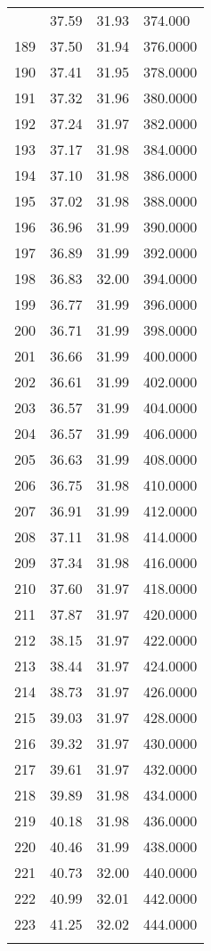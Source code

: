 \documentclass[
  captions=tableheading,
]{scrartcl}
\begin{document}
\begin{longtable} {l|l|l|l}
{188 &	 37.59 & 31.93 & 374.000\\
189 &	37.50 &	31.94 &	376.0000\\
190 &	37.41 &	31.95 &	378.0000\\
191 &	37.32 &	31.96 &	380.0000\\
192 &	37.24 &	31.97 &	382.0000\\
193 &	37.17 &	31.98 &	384.0000\\
194 &	37.10 &	31.98 &	386.0000\\
195 &	37.02 &	31.98 &	388.0000\\
196 &	36.96 &	31.99 &	390.0000\\
197 &	36.89 &	31.99 &	392.0000\\
198 &	36.83 &	32.00 &	394.0000\\
199 &	36.77 &	31.99 &	396.0000\\
200 &	36.71 &	31.99 &	398.0000\\
201 &	36.66 &	31.99 &	400.0000\\
202 &	36.61 &	31.99 &	402.0000\\
203 &	36.57 &	31.99 &	404.0000\\
204 &	36.57 &	31.99 &	406.0000\\
205 &	36.63 &	31.99 &	408.0000\\
206 &	36.75 &	31.98 &	410.0000\\
207 &	36.91 &	31.99 &	412.0000\\
208 &	37.11 &	31.98 &	414.0000\\
209 &	37.34 &	31.98 &	416.0000\\
210 &	37.60 &	31.97 &	418.0000\\
211 &	37.87 &	31.97 &	420.0000\\
212 &	38.15 &	31.97 &	422.0000\\
213 &	38.44 &	31.97 &	424.0000\\
214 &	38.73 &	31.97 &	426.0000\\
215 &	39.03 &	31.97 &	428.0000\\
216 &	39.32 &	31.97 &	430.0000\\
217 &	39.61 &	31.97 &	432.0000\\
218 &	39.89 &	31.98 &	434.0000\\
219 &	40.18 &	31.98 &	436.0000\\
220 &	40.46 &	31.99 &	438.0000\\
221 &	40.73 &	32.00 &	440.0000\\
222 &	40.99 &	32.01 &	442.0000\\
223 &	41.25 &	32.02 &	444.0000\\
}
\end{longtable}
\end{document}
